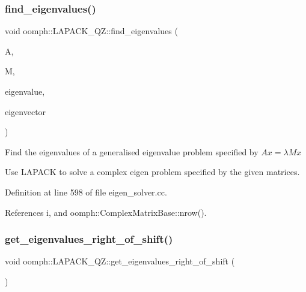\subsubsection{\texorpdfstring{find\+\_\+eigenvalues()}{find\_eigenvalues()}}
{\footnotesize\ttfamily void oomph\+::\+L\+A\+P\+A\+C\+K\+\_\+\+Q\+Z\+::find\+\_\+eigenvalues (\begin{DoxyParamCaption}\item[{const \hyperlink{classoomph_1_1ComplexMatrixBase}{Complex\+Matrix\+Base} \&}]{A,  }\item[{const \hyperlink{classoomph_1_1ComplexMatrixBase}{Complex\+Matrix\+Base} \&}]{M,  }\item[{\hyperlink{classoomph_1_1Vector}{Vector}$<$ std\+::complex$<$ double $>$ $>$ \&}]{eigenvalue,  }\item[{\hyperlink{classoomph_1_1Vector}{Vector}$<$ \hyperlink{classoomph_1_1Vector}{Vector}$<$ std\+::complex$<$ double $>$ $>$ $>$ \&}]{eigenvector }\end{DoxyParamCaption})}

Find the eigenvalues of a generalised eigenvalue problem specified by $ Ax = \lambda Mx $

Use L\+A\+P\+A\+CK to solve a complex eigen problem specified by the given matrices. 

Definition at line 598 of file eigen\+\_\+solver.\+cc.



References i, and oomph\+::\+Complex\+Matrix\+Base\+::nrow().

\mbox{\label{classoomph_1_1LAPACK__QZ_ad768222e9e93bcacd0602222e0ac93de}} 
\subsubsection{\texorpdfstring{get\+\_\+eigenvalues\+\_\+right\+\_\+of\+\_\+shift()}{get\_eigenvalues\_right\_of\_shift()}}
{\footnotesize\ttfamily void oomph\+::\+L\+A\+P\+A\+C\+K\+\_\+\+Q\+Z\+::get\+\_\+eigenvalues\+\_\+right\+\_\+of\+\_\+shift (\begin{DoxyParamCaption}{ }\end{DoxyParamCaption})\hspace{0.3cm}{\ttfamily [inline]}}

